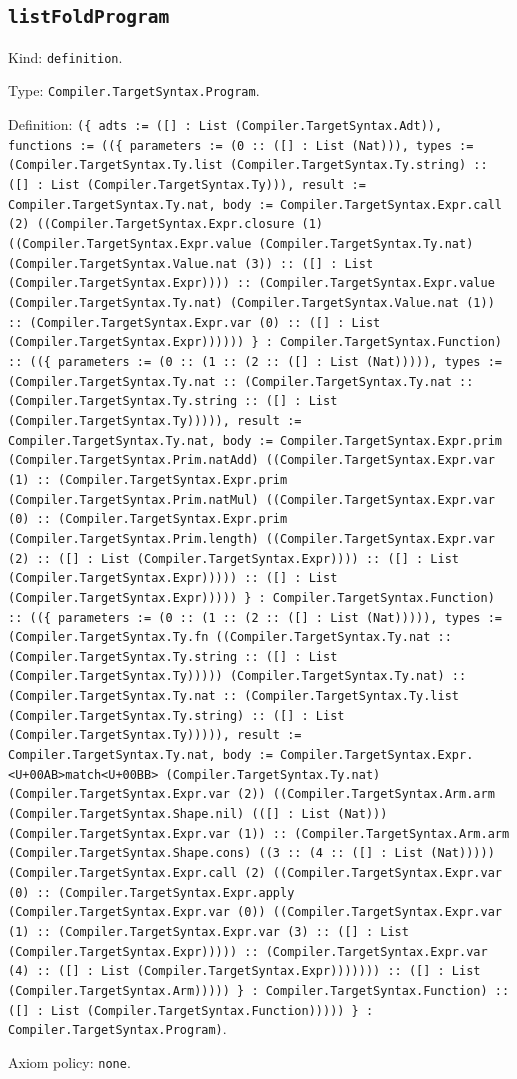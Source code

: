\documentclass[11pt]{article}
\begin{document}
\subsection*{\texttt{listFoldProgram}}
\noindent Kind: \texttt{definition}.\par
\noindent Type: \texttt{Compiler.TargetSyntax.Program}.\par
\noindent Definition: \texttt{(\{ adts := ([] : List (Compiler.TargetSyntax.Adt)), functions := ((\{ parameters := (0 :: ([] : List (Nat))), types := (Compiler.TargetSyntax.Ty.list (Compiler.TargetSyntax.Ty.string) :: ([] : List (Compiler.TargetSyntax.Ty))), result := Compiler.TargetSyntax.Ty.nat, body := Compiler.TargetSyntax.Expr.call (2) ((Compiler.TargetSyntax.Expr.closure (1) ((Compiler.TargetSyntax.Expr.value (Compiler.TargetSyntax.Ty.nat) (Compiler.TargetSyntax.Value.nat (3)) :: ([] : List (Compiler.TargetSyntax.Expr)))) :: (Compiler.TargetSyntax.Expr.value (Compiler.TargetSyntax.Ty.nat) (Compiler.TargetSyntax.Value.nat (1)) :: (Compiler.TargetSyntax.Expr.var (0) :: ([] : List (Compiler.TargetSyntax.Expr)))))) \} : Compiler.TargetSyntax.Function) :: ((\{ parameters := (0 :: (1 :: (2 :: ([] : List (Nat))))), types := (Compiler.TargetSyntax.Ty.nat :: (Compiler.TargetSyntax.Ty.nat :: (Compiler.TargetSyntax.Ty.string :: ([] : List (Compiler.TargetSyntax.Ty))))), result := Compiler.TargetSyntax.Ty.nat, body := Compiler.TargetSyntax.Expr.prim (Compiler.TargetSyntax.Prim.natAdd) ((Compiler.TargetSyntax.Expr.var (1) :: (Compiler.TargetSyntax.Expr.prim (Compiler.TargetSyntax.Prim.natMul) ((Compiler.TargetSyntax.Expr.var (0) :: (Compiler.TargetSyntax.Expr.prim (Compiler.TargetSyntax.Prim.length) ((Compiler.TargetSyntax.Expr.var (2) :: ([] : List (Compiler.TargetSyntax.Expr)))) :: ([] : List (Compiler.TargetSyntax.Expr))))) :: ([] : List (Compiler.TargetSyntax.Expr))))) \} : Compiler.TargetSyntax.Function) :: ((\{ parameters := (0 :: (1 :: (2 :: ([] : List (Nat))))), types := (Compiler.TargetSyntax.Ty.fn ((Compiler.TargetSyntax.Ty.nat :: (Compiler.TargetSyntax.Ty.string :: ([] : List (Compiler.TargetSyntax.Ty))))) (Compiler.TargetSyntax.Ty.nat) :: (Compiler.TargetSyntax.Ty.nat :: (Compiler.TargetSyntax.Ty.list (Compiler.TargetSyntax.Ty.string) :: ([] : List (Compiler.TargetSyntax.Ty))))), result := Compiler.TargetSyntax.Ty.nat, body := Compiler.TargetSyntax.Expr.<U+00AB>match<U+00BB> (Compiler.TargetSyntax.Ty.nat) (Compiler.TargetSyntax.Expr.var (2)) ((Compiler.TargetSyntax.Arm.arm (Compiler.TargetSyntax.Shape.nil) (([] : List (Nat))) (Compiler.TargetSyntax.Expr.var (1)) :: (Compiler.TargetSyntax.Arm.arm (Compiler.TargetSyntax.Shape.cons) ((3 :: (4 :: ([] : List (Nat))))) (Compiler.TargetSyntax.Expr.call (2) ((Compiler.TargetSyntax.Expr.var (0) :: (Compiler.TargetSyntax.Expr.apply (Compiler.TargetSyntax.Expr.var (0)) ((Compiler.TargetSyntax.Expr.var (1) :: (Compiler.TargetSyntax.Expr.var (3) :: ([] : List (Compiler.TargetSyntax.Expr))))) :: (Compiler.TargetSyntax.Expr.var (4) :: ([] : List (Compiler.TargetSyntax.Expr))))))) :: ([] : List (Compiler.TargetSyntax.Arm))))) \} : Compiler.TargetSyntax.Function) :: ([] : List (Compiler.TargetSyntax.Function))))) \} : Compiler.TargetSyntax.Program)}.\par
\noindent Axiom policy: \texttt{none}.\par
\end{document}
